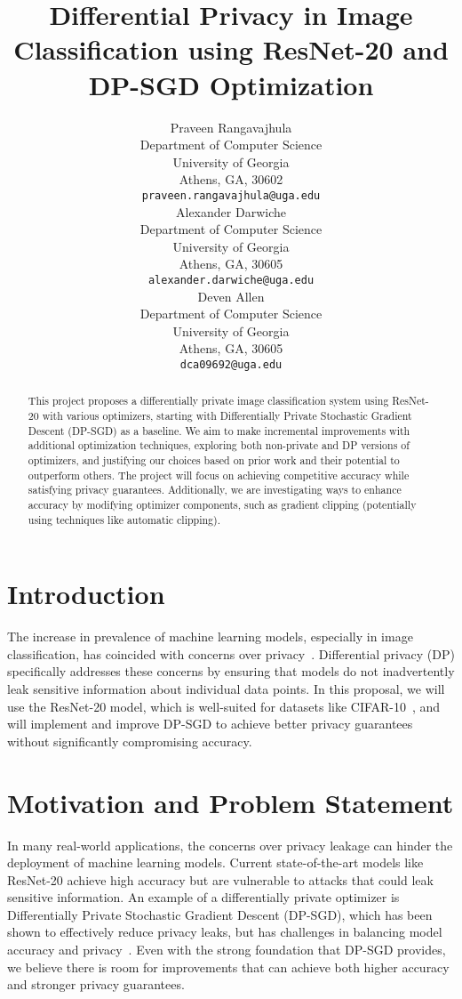 \documentclass{article}
\title{Differential Privacy in Image Classification using ResNet-20 and DP-SGD Optimization}
\author{
    Praveen Rangavajhula\\
    Department of Computer Science\\
    University of Georgia\\
    Athens, GA, 30602\\
    \texttt{praveen.rangavajhula@uga.edu} \\
    \And
    Alexander Darwiche\\
    Department of Computer Science\\
    University of Georgia\\
    Athens, GA, 30605 \\
    \texttt{alexander.darwiche@uga.edu} \\
    \And
    Deven Allen\\
    Department of Computer Science\\
    University of Georgia\\
    Athens, GA, 30605 \\
    \texttt{dca09692@uga.edu} \\
}
\begin{document}
    \maketitle

    \begin{abstract}

        This project proposes a differentially private image classification system using ResNet-20 with various
        optimizers, starting with Differentially Private Stochastic Gradient Descent (DP-SGD) as a baseline.
        We aim to make incremental improvements with additional optimization techniques, exploring both non-private
        and DP versions of optimizers, and justifying our choices based on prior work and their potential
        to outperform others.
        The project will focus on achieving competitive accuracy while satisfying privacy guarantees.
        Additionally, we are investigating ways to enhance accuracy by modifying optimizer components,
        such as gradient clipping (potentially using techniques like automatic clipping).

    \end{abstract}


    \section{Introduction}\label{sec:introduction}

    The increase in prevalence of machine learning models, especially in image classification,
    has coincided with concerns over privacy~\cite{papernot2022hyperparametertuningrenyidifferential}.
    Differential privacy (DP) specifically addresses these concerns by ensuring that models do not inadvertently leak sensitive
    information about individual data points.
    In this proposal, we will use the ResNet-20 model, which is well-suited for datasets like CIFAR-10~\cite{Idelbayev_ResNet20},
    and will implement and improve DP-SGD to achieve better privacy guarantees without significantly compromising accuracy.


    \section{Motivation and Problem Statement}\label{sec:motivation-and-problem-statement}
    In many real-world applications, the concerns over privacy leakage can hinder the deployment of machine
    learning models.
    Current state-of-the-art models like ResNet-20 achieve high accuracy but are vulnerable to attacks that could leak
    sensitive information.
    An example of a differentially private optimizer is Differentially Private Stochastic Gradient Descent (DP-SGD), which has been shown
    to effectively reduce privacy leaks, but has challenges in balancing model accuracy and privacy~\cite{Abadi_2016_DeepLearningDifferentialPrivacy}.
    Even with the strong foundation that DP-SGD provides, we believe there is room for improvements that can
    achieve both higher accuracy and stronger privacy guarantees.
\end{document}
